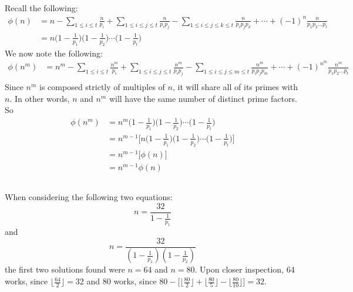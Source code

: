 \documentclass{article}
\begin{document}
\subsection{} %
Recall the following:
\begin{align*}
	\phi(n)&=n-\sum_{1\le{i}\le{t}}\frac{n}{p_i}
	+\sum_{1\le{i}\le{j}\le{t}}\frac{n}{p_{i}p_{j}}
	-\sum_{1\le{i}\le{j}\le{k}\le{t}}\frac{n}{p_{i}p_{j}p_{k}}
	+\cdots
	+(-1)^{n}\frac{n}{p_{1}p_{2}\ldots{p_{t}}}\\
	&=n\bigg(1-\frac{1}{p_1}\bigg)\bigg(1-\frac{1}{p_2}\bigg)\cdots\bigg(1-\frac{1}{p_t}\bigg)
\end{align*}
We now note the following:
\begin{align*}
	\phi(n^m)&=n^m-\sum_{1\le{i}\le{t}}\frac{n^m}{p_i}
	+\sum_{1\le{i}\le{j}\le{t}}\frac{n^m}{p_{i}p_{j}}
	-\sum_{1\le{i}\le{j}\le{m}\le{t}}\frac{n^m}{p_{i}p_{j}p_{m}}
	+\cdots
	+(-1)^{n^m}\frac{n^m}{p_{1}p_{2}\ldots{p_{t}}}\\
\end{align*}
Since $n^m$ is composed strictly of multiples of $n$, it will share all of its
primes with $n$. In other words, $n$ and $n^m$ will have the same number of
distinct prime factors. So
\begin{align*}
	\phi(n^m)&=n^m\bigg(1-\frac{1}{p_1}\bigg)\bigg(1-\frac{1}{p_2}\bigg)\cdots\bigg(1-\frac{1}{p_t}\bigg)\\
	&=n^{m-1}\bigg[n\bigg(1-\frac{1}{p_1}\bigg)\bigg(1-\frac{1}{p_2}\bigg)\cdots\bigg(1-\frac{1}{p_t}\bigg)\bigg]\\
	&=n^{m-1}\bigg[\phi(n)\bigg]\\
	&=n^{m-1}\phi(n)
\end{align*}
\subsection{} %
When considering the following two equations:
\[n=\frac{32}{1-\frac{1}{p_1}}\]
and
\[n=\frac{32}{(1-\frac{1}{p_1})(1-\frac{1}{p_2})}\]
the first two solutions found were $n=64$ and $n=80$. Upon closer inspection,
64 works, since $\big\lfloor\frac{64}{2}\big\rfloor=32$ and 80 works, since
$80-\bigg[\big\lfloor\frac{80}{2}\big\rfloor+\big\lfloor\frac{80}{5}\big\rfloor
-\big\lfloor\frac{80}{10}\big\rfloor\bigg]=32$.
\end{document}
